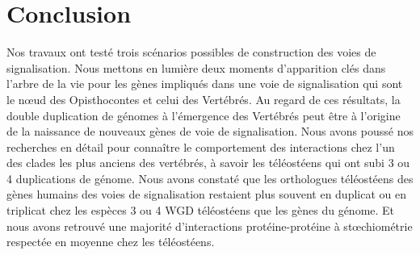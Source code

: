 \chapter[Conclusion]{Conclusion}
\thispagestyle{firstpage}
\onehalfspacing

\par Nos travaux ont testé trois scénarios possibles de construction des voies de signalisation. Nous mettons en lumière deux moments d’apparition clés dans l’arbre de la vie pour les gènes impliqués dans une voie de signalisation qui sont le nœud des Opisthocontes et celui des Vertébrés. Au regard de ces résultats, la double duplication de génomes à l’émergence des Vertébrés peut être à l’origine de la naissance de nouveaux gènes de voie de signalisation. Nous avons poussé nos recherches en détail pour connaître le comportement des interactions chez l'un des clades les plus anciens des vertébrés, à savoir les téléostéens qui ont subi 3 ou 4 duplications de génome. Nous avons constaté que les orthologues téléostéens des gènes humains des voies de signalisation restaient plus souvent en duplicat ou en triplicat chez les espèces 3 ou 4 WGD téléostéens que les gènes du génome. Et nous avons retrouvé une majorité d’interactions protéine-protéine à stœchiométrie respectée en moyenne chez les téléostéens.